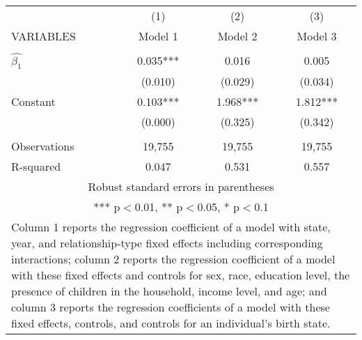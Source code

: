 \begin{tabular}{lccc}
\hline
 & (1) & (2) & (3) \\
VARIABLES & Model 1 & Model 2 & Model 3 \\ \hline
 &  &  &  \\
$\hat{\beta_1}$ & 0.035*** & 0.016 & 0.005 \\
 & (0.010) & (0.029) & (0.034) \\
Constant & 0.103*** & 1.968*** & 1.812*** \\
 & (0.000) & (0.325) & (0.342) \\
 &  &  &  \\
Observations & 19,755 & 19,755 & 19,755 \\
 R-squared & 0.047 & 0.531 & 0.557 \\ \hline
\multicolumn{4}{c}{ Robust standard errors in parentheses} \\
\multicolumn{4}{c}{ *** p$<$0.01, ** p$<$0.05, * p$<$0.1} \\
\multicolumn{4}{p{0.8\linewidth}}{\small Column 1 reports the regression coefficient of a model with state, year, and relationship-type fixed effects including corresponding interactions; column 2 reports the regression coefficient of a model with these fixed effects and controls for sex, race, education level, the presence of children in the household, income level, and age; and column 3 reports the regression coefficients of a model with these fixed effects, controls, and controls for an individual’s birth state.} \\
\end{tabular}
